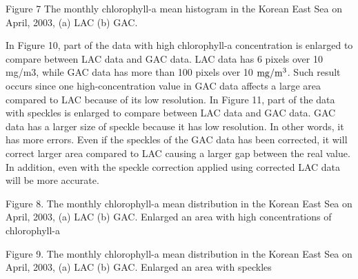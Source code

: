   
  Figure 7 The monthly chlorophyll-a mean histogram in the Korean East Sea on April, 2003, (a) LAC (b) GAC.
  
  
   In Figure 10, part of the data with high chlorophyll-a concentration is enlarged to compare between LAC data and GAC data. LAC data has 6 pixels over 10 mg/m3, while GAC data has more than 100 pixels over 10 $\rm mg/m^3$. Such result occurs since one high-concentration value in GAC data affects a large area compared to LAC because of its low resolution.
  In Figure 11, part of the data with speckles is enlarged to compare between LAC data and GAC data. GAC data has a larger size of speckle because it has low resolution. In other words, it has more errors. Even if the speckles of the GAC data has been corrected, it will correct larger area compared to LAC causing a larger gap between the real value. In addition, even with the speckle correction applied using corrected LAC data will be more accurate.
  
  Figure 8. The monthly chlorophyll-a mean distribution in the Korean East Sea on April, 2003, (a) LAC (b) GAC. Enlarged an area with high concentrations of chlorophyll-a
  
  Figure 9. The monthly chlorophyll-a mean distribution in the Korean East Sea on April, 2003, (a) LAC (b) GAC. Enlarged an area with speckles
  
  
  
  